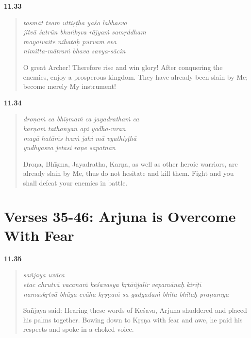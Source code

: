 \par\noindent\textbf{11.33}\par
\begin{verse}
\textit{tasmāt tvam uttiṣṭha yaśo labhasva} \\
\textit{jitvā śatrūn bhuṅkṣva rājyaṁ samṛddham} \\
\textit{mayaivaite nihatāḥ pūrvam eva} \\
\textit{nimitta-mātraṁ bhava savya-sācin}

\noindent O great Archer! Therefore rise and win glory! After conquering the enemies, enjoy a prosperous kingdom. They have already been slain by Me; become merely My instrument!
\end{verse}
\par



\par\noindent\textbf{11.34}\par
\begin{verse}
\textit{droṇaṁ ca bhīṣmaṁ ca jayadrathaṁ ca} \\
\textit{karṇaṁ tathānyān api yodha-vīrān} \\
\textit{mayā hatāṁs tvaṁ jahi mā vyathiṣṭhā} \\
\textit{yudhyasva jetāsi raṇe sapatnān}

\noindent Droṇa, Bhīṣma, Jayadratha, Karṇa, as well as other heroic warriors, are already slain by Me, thus do not hesitate and kill them. Fight and you shall defeat your enemies in battle.
\end{verse}
\par


\newpage
\section{Verses 35-46: Arjuna is Overcome With Fear}\label{sec-verses-35-46-arjuna-is-overcome-with-fear}


\par\noindent\textbf{11.35}\par
\begin{verse}
\textit{sañjaya uvāca} \\
\textit{etac chrutvā vacanaṁ keśavasya kṛtāñjalir vepamānaḥ kirīṭī} \\
\textit{namaskṛtvā bhūya evāha kṛṣṇaṁ sa-gadgadaṁ bhīta-bhītaḥ praṇamya}

\noindent Sañjaya said: Hearing these words of Keśava, Arjuna shuddered and placed his palms together. Bowing down to Kṛṣṇa with fear and awe, he paid his respects and spoke in a choked voice.
\end{verse}
\par



